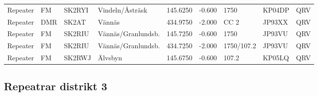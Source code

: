 {\begin{landscape}
\begin{longtable}{llllrrlll}
Repeater   & FM          & SK2RYI    & Vindeln/Åsträsk    & 145.6250     & -0.600     & 1750       & KP04DP      & QRV      \\
Repeater   & DMR         & SK2AT     & Vännäs             & 434.9750     & -2.000     & CC 2       & JP93XX      & QRV      \\
Repeater   & FM          & SK2RIU    & Vännäs/Granlundsb. & 145.7250     & -0.600     & 1750       & JP93VU      & QRV      \\
Repeater   & FM          & SK2RIU    & Vännäs/Granlundsb. & 434.7250     & -2.000     & 1750/107.2 & JP93VU      & QRV      \\
Repeater   & FM          & SK2RWJ    & Älvsbyn            & 145.6750     & -0.600     & 107.2      & KP05LQ      & QRV      \\
\end{longtable}



\clearpage

\subsection{Repeatrar distrikt 3}




\end{landscape}}
